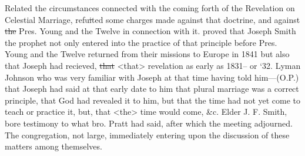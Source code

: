 				Related the circumstances connected with the coming forth of the Revelation on Celestial Marriage, refu\sout{i}ted some charges made against that doctrine, and against \sout{the} Pres. Young and the Twelve in connection with it. proved that Joseph Smith the prophet not only entered into the practice of that principle before Pres. Young and the Twelve returned from their missions to Europe in 1841 but also that Joseph had recieved, \sout{that} <that> revelation as early as 1831-- or `32. Lyman Johnson who was very familiar with Joseph at that time having told him---(O.P.) that Joseph had said at that early date to him that plural marriage was a correct principle, that God had revealed it to him, but that the time had not yet come to teach or practice it, but, that <the> time would come, \&c. Elder J. F. Smith, bore testimony to what bro. Pratt had said, after which the meeting adjourned. The congregation, not large, immediately entering upon the discussion of these matters among themselves.